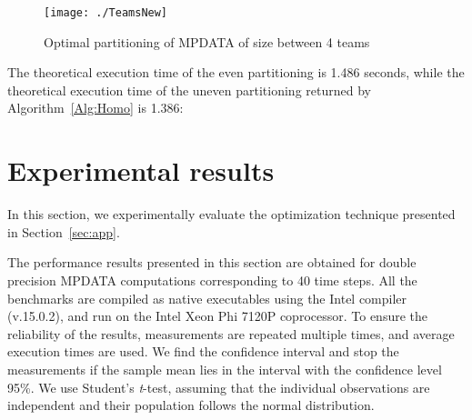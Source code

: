 \documentclass{acm_proc_article-sp}
\begin{document}
\begin{figure}[h!]
\begin{center}
\texttt{[image: ./TeamsNew]}
\caption{Optimal partitioning of MPDATA of size   between 4 teams}
\label{fig:TeamsNew}
\end{center}
\end{figure}

The theoretical execution time of the even partitioning is 1.486 seconds, while the theoretical execution time of the uneven partitioning returned by Algorithm~\ref{Alg:Homo} is 1.386:



\section{Experimental results}

\label{sec:result}

In this section, we experimentally evaluate the optimization technique presented in Section~\ref{sec:app}.


The performance results presented in this section are obtained for  double precision MPDATA computations corresponding to 40 time steps.
All the benchmarks are compiled as native executables using the Intel compiler (v.15.0.2), and run on the Intel Xeon Phi 7120P coprocessor.
To ensure the reliability of the results, measurements are repeated multiple times, and average execution times are used. 
We find the confidence interval and stop the measurements if the sample mean lies in the interval with the confidence level 95\%. 
We use Student's \textit{t}-test, assuming that the individual observations are independent and their population follows the normal distribution. 
\end{document}
